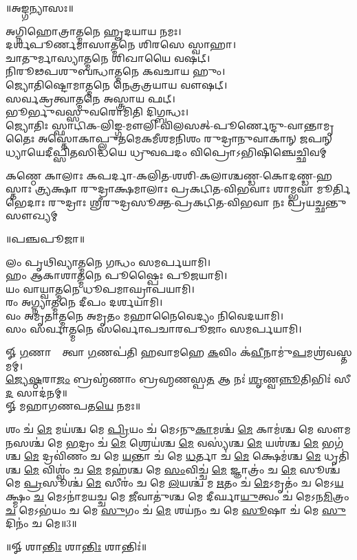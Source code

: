 \centerline{॥𑌅𑌙𑍍𑌗𑌨𑍍𑌯𑌾𑌸𑌃॥}
𑌅𑌗𑍍𑌨𑌿𑌹𑍋𑌤𑍍𑌰𑌾𑌤𑍍𑌮𑌨𑍇 𑌹𑍄𑌦𑌯𑌾𑌯 𑌨𑌮𑌃।\\
𑌦𑌰𑍍𑌶𑌪𑍂𑌰𑍍𑌣𑌮𑌾𑌸𑌾𑌤𑍍𑌮𑌨𑍇 𑌶𑌿𑌰𑌸𑍇 𑌸𑍍𑌵𑌾𑌹𑌾।\\
𑌚𑌾𑌤𑍁𑌰𑍍𑌮𑌾𑌸𑍍𑌯𑌾𑌤𑍍𑌮𑌨𑍇 𑌶𑌿𑌖𑌾𑌯𑍈 𑌵𑌷𑌟𑍍।\\
𑌨𑌿𑌰𑍂𑌢𑌪𑌶𑍁𑌬𑌨𑍍𑌧𑌾𑌤𑍍𑌮𑌨𑍇 𑌕𑌵𑌚𑌾𑌯 𑌹𑍁𑌂।\\
𑌜𑍍𑌯𑍋𑌤𑌿𑌷𑍍𑌟𑍋𑌮𑌾𑌤𑍍𑌮𑌨𑍇 𑌨𑍇𑌤𑍍𑌰𑌤𑍍𑌰𑌯𑌾𑌯 𑌵𑍗𑌷𑌟𑍍।\\
𑌸𑌰𑍍𑌵𑌕𑍍𑌰𑌤𑍍𑌵𑌾𑌤𑍍𑌮𑌨𑍇 𑌅𑌸𑍍𑌤𑍍𑌰𑌾𑌯 𑌫𑌟𑍍।\\
𑌭𑍂𑌰𑍍𑌭𑍁𑌵𑌸𑍍𑌸𑍁𑌵𑌰𑍋𑌮𑌿𑌤𑌿 𑌦𑌿𑌗𑍍𑌬𑌨𑍍𑌧𑌃।\\

\setlength{\shlokaspaceskip}{2pt}
{𑌜𑍍𑌯𑍋𑌤𑌿𑌃 𑌸𑍍𑌫𑌾𑌟𑌿𑌕-𑌲𑌿𑌙𑍍𑌗-𑌮𑍗𑌲𑌿-𑌵𑌿𑌲𑌸𑌤𑍍-𑌪𑍂𑌰𑍍𑌣𑍇𑌨𑍍𑌦𑍁-𑌵𑌾𑌨𑍍𑌤𑌾𑌮𑍃𑌤𑍈𑌃}
{𑌅𑌸𑍍𑌤𑍋𑌕𑌾𑌪𑍍𑌲𑍁𑌤𑌮𑍇𑌕𑌮𑍀𑌶𑌮𑌨𑌿𑌶𑌂 𑌰𑍁𑌦𑍍𑌰𑌾𑌨𑍁𑌵𑌾𑌕𑌾𑌨𑍍 𑌜𑌪𑌨𑍍}
{𑌧𑍍𑌯𑌾𑌯𑍇𑌦𑍀𑌪𑍍𑌸𑌿𑌤𑌸𑌿𑌦𑍍𑌧𑌯𑍇 𑌧𑍍𑌰𑍁𑌵𑌪𑌦𑌂 𑌵𑌿𑌪𑍍𑌰𑍋𑌽𑌭𑌿𑌷𑌿𑌞𑍍𑌚𑍇𑌚𑍍𑌛𑌿𑌵𑌮𑍍}

{𑌕𑌣𑍍𑌠𑍇 𑌕𑌾𑌲𑌾𑌃 𑌕𑌪𑌰𑍍𑌦𑌾-𑌕𑌲𑌿𑌤-𑌶𑌶𑌿-𑌕𑌲𑌾𑌶𑍍𑌚𑌣𑍍𑌡-𑌕𑍋𑌦𑌣𑍍𑌡-𑌹𑌸𑍍𑌤𑌾𑌃}
{𑌤𑍍𑌰𑍍𑌯𑌕𑍍𑌷𑌾 𑌰𑍁𑌦𑍍𑌰𑌾𑌕𑍍𑌷𑌮𑌾𑌲𑌾𑌃 𑌪𑍍𑌰𑌕𑌟𑌿𑌤-𑌵𑌿𑌭𑌵𑌾𑌃 𑌶𑌾𑌮𑍍𑌭𑌵𑌾 𑌮𑍂𑌰𑍍𑌤𑌿𑌭𑍇𑌦𑌾𑌃}
{𑌰𑍁𑌦𑍍𑌰𑌾𑌃 𑌶𑍍𑌰𑍀𑌰𑍁𑌦𑍍𑌰𑌸𑍂𑌕𑍍𑌤-𑌪𑍍𑌰𑌕𑌟𑌿𑌤-𑌵𑌿𑌭𑌵𑌾 𑌨𑌃 𑌪𑍍𑌰𑌯𑌚𑍍𑌛𑌨𑍍𑌤𑍁 𑌸𑍗𑌖𑍍𑌯𑌮𑍍}

\centerline{॥𑌪𑌞𑍍𑌚𑌪𑍂𑌜𑌾॥}

𑌲𑌂 𑌪𑍃𑌥𑌿𑌵𑍍𑌯𑌾𑌤𑍍𑌮𑌨𑍇 𑌗𑌨𑍍𑌧𑌂 𑌸𑌮𑌰𑍍𑌪𑌯𑌾𑌮𑌿।\\
𑌹𑌂 𑌆𑌕𑌾𑌶𑌾𑌤𑍍𑌮𑌨𑍇 𑌪𑍂𑌷𑍍𑌪𑍈𑌃 𑌪𑍂𑌜𑌯𑌾𑌮𑌿।\\
𑌯𑌂 𑌵𑌾𑌯𑍍𑌵𑌾𑌤𑍍𑌮𑌨𑍇 𑌧𑍂𑌪𑌮𑌾𑌘𑍍𑌰𑌾𑌪𑌯𑌾𑌮𑌿।\\
𑌰𑌂 𑌅𑌗𑍍𑌨𑍍𑌯𑌾𑌤𑍍𑌮𑌨𑍇 𑌦𑍀𑌪𑌂 𑌦𑌰𑍍𑌶𑌯𑌾𑌮𑌿।\\
𑌵𑌂 𑌅𑌮𑍃𑌤𑌾𑌤𑍍𑌮𑌨𑍇 𑌅𑌮𑍃𑌤𑌂 𑌮𑌹𑌾𑌨𑍈𑌵𑍇𑌦𑍍𑌯𑌂 𑌨𑌿𑌵𑍇𑌦𑌯𑌾𑌮𑌿।\\
𑌸𑌂 𑌸𑌰𑍍𑌵𑌾𑌤𑍍𑌮𑌨𑍇 𑌸𑌰𑍍𑌵𑍋𑌪𑌚𑌾𑌰𑌪𑍂𑌜𑌾𑌂 𑌸𑌮𑌰𑍍𑌪𑌯𑌾𑌮𑌿।

𑍐 \ul{𑌗}𑌣𑌾𑌨𑌾𑌂᳚ 𑌤𑍍𑌵𑌾 \ul{𑌗}𑌣𑌪॑𑌤𑌿 𑌹𑌵𑌾𑌮𑌹𑍇 \ul{𑌕}𑌵𑌿𑌂 𑌕॑\ul{𑌵𑍀}𑌨𑌾𑌮𑍁॑\ul{𑌪}\-𑌮𑌶𑍍𑌰॑𑌵𑌸𑍍𑌤𑌮𑌮𑍍। \\
\ul{𑌜𑍍𑌯𑍇}\ul{𑌷𑍍𑌠}𑌰𑌾\ul{𑌜𑌂} 𑌬𑍍𑌰𑌹𑍍𑌮॑𑌣𑌾𑌂 𑌬𑍍𑌰𑌹𑍍𑌮𑌣𑌸𑍍𑌪\ul{𑌤} 𑌆 𑌨𑌃॑ \ul{𑌶𑍃}𑌣𑍍𑌵\ul{𑌨𑍍𑌨𑍂}𑌤𑌿𑌭𑌿𑌃॑ 𑌸𑍀\ul{𑌦} 𑌸𑌾𑌦॑𑌨𑌮𑍍॥ \\
𑍐 𑌮𑌹𑌾𑌗𑌣𑌪𑌤\ul{𑌯𑍇} 𑌨𑌮𑌃॥ 


𑌶𑌂 𑌚॑ \ul{𑌮𑍇} 𑌮𑌯॑𑌶𑍍𑌚 𑌮𑍇 \ul{𑌪𑍍𑌰𑌿}𑌯𑌂 𑌚॑ 𑌮𑍇𑌽𑌨𑍁\ul{𑌕𑌾}𑌮𑌶𑍍𑌚॑ \ul{𑌮𑍇} 𑌕𑌾𑌮॑𑌶𑍍𑌚 𑌮𑍇 𑌸𑍗𑌮\ul{𑌨}𑌸𑌶𑍍𑌚॑ 𑌮𑍇 \ul{𑌭}𑌦𑍍𑌰𑌂 𑌚॑ \ul{𑌮𑍇} 𑌶𑍍𑌰𑍇𑌯॑𑌶𑍍𑌚 \ul{𑌮𑍇} 𑌵𑌸𑍍𑌯॑𑌶𑍍𑌚 \ul{𑌮𑍇} 𑌯𑌶॑𑌶𑍍𑌚 \ul{𑌮𑍇} 𑌭𑌗॑𑌶𑍍𑌚 \ul{𑌮𑍇} 𑌦𑍍𑌰𑌵𑌿॑𑌣𑌂 𑌚 𑌮𑍇 \ul{𑌯}𑌨𑍍𑌤𑌾 𑌚॑ 𑌮𑍇 \ul{𑌧}𑌰𑍍𑌤𑌾 𑌚॑ \ul{𑌮𑍇} 𑌕𑍍𑌷𑍇𑌮॑𑌶𑍍𑌚 \ul{𑌮𑍇} 𑌧𑍃𑌤𑌿॑𑌶𑍍𑌚 \ul{𑌮𑍇} 𑌵𑌿𑌶𑍍𑌵𑌂॑ 𑌚 \ul{𑌮𑍇} 𑌮𑌹॑𑌶𑍍𑌚 𑌮𑍇 \ul{𑌸𑌂}𑌵𑌿𑌚𑍍𑌚॑ \ul{𑌮𑍇} 𑌜𑍍𑌞𑌾𑌤𑍍𑌰𑌂॑ 𑌚 \ul{𑌮𑍇} 𑌸𑍂𑌶𑍍𑌚॑ 𑌮𑍇 \ul{𑌪𑍍𑌰}𑌸𑍂𑌶𑍍𑌚॑ \ul{𑌮𑍇} 𑌸𑍀𑌰𑌂॑ 𑌚 𑌮𑍇 \ul{𑌲}𑌯𑌶𑍍𑌚॑ 𑌮 \ul{𑌋}𑌤𑌂 𑌚॑ \ul{𑌮𑍇}𑌽𑌮𑍃𑌤𑌂॑ 𑌚 𑌮𑍇𑌽\ul{𑌯}𑌕𑍍𑌷𑍍𑌮𑌂 \ul{𑌚} 𑌮𑍇𑌽𑌨𑌾॑𑌮𑌯𑌚𑍍𑌚 𑌮𑍇 \ul{𑌜𑍀}𑌵𑌾𑌤𑍁॑𑌶𑍍𑌚 𑌮𑍇 𑌦𑍀𑌰𑍍𑌘𑌾\ul{𑌯𑍁}𑌤𑍍𑌵𑌂 𑌚॑ 𑌮𑍇𑌽𑌨\ul{𑌮𑌿}𑌤𑍍𑌰𑌂 \ul{𑌚} 𑌮𑍇𑌽𑌭॑𑌯𑌂 𑌚 𑌮𑍇 \ul{𑌸𑍁}𑌗𑌂 𑌚॑ \ul{𑌮𑍇} 𑌶𑌯॑𑌨𑌂 𑌚 𑌮𑍇 \ul{𑌸𑍂}𑌷𑌾 𑌚॑ 𑌮𑍇 \ul{𑌸𑍁}𑌦𑌿𑌨𑌂॑ 𑌚 𑌮𑍇॥3॥ 
\centerline{॥𑍐 𑌶𑌾\ul{𑌨𑍍𑌤𑌿𑌃} 𑌶𑌾\ul{𑌨𑍍𑌤𑌿𑌃} 𑌶𑌾𑌨𑍍𑌤𑌿𑌃॑॥}
{\closesection}
